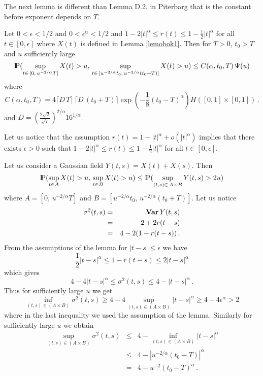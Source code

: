 The next lemma is different than Lemma D.2. in Piterbarg \cite{pit:96} that is the constant before 
exponent depends on $T$.
\begin{lemma}\label{lemdlak}
Let $0<\epsilon<1/2$ and $0<\epsilon^\alpha<1/2$ and $1-2|t|^\alpha\leq r(t)\leq 1-\frac{1}{2}|t|^\alpha$
for all $t\in [0,\epsilon]$ where $X(t)$ is defined in Lemma \ref{lemobok1}.
Then for $T>0$, $t_0>T$ and $u$ sufficiently large
$$
{\rm I\hspace{-0.8mm}P}(\sup_{t\in\, [0,\,u^{-2/\alpha}T]}X(t)>u,\,\sup_{t\in\, [u^{-2/\alpha}t_0,\,u^{-2/\alpha}(t_0+T)]}X(t)>u)
\leq C(\alpha,t_0,T)\,\Psi(u)
$$
where
$$
C(\alpha,t_0,T)=
4\lceil D\,T \rceil
\,\lceil D\,(t_0+T) \rceil
\exp(-\frac{1}{8}(t_0-T)^\alpha)H([0,1]\times [0,1])\,.
$$
and  $D=\left(\frac{2\sqrt{2}}{\sqrt{7}}\right)^{2/\alpha}16^{1/\alpha}$.
\end{lemma}
\begin{remark}
Let us notice that the assumption $r(t)=1-|t|^\alpha+o(|t|^\alpha)$ implies that
there exists $\epsilon>0$ such that $1-2|t|^\alpha\leq r(t)\leq 1-\frac{1}{2}|t|^\alpha$ for all $t\in [0,\epsilon]$.
\end{remark}
\proof
Let us consider a Gaussian field $Y(t,s)=X(t)+X(s)$. Then
\begin{equation}\label{esty}
{\rm I\hspace{-0.8mm}P}(\sup_{t\in A} X(t)>u,\,\sup_{t\in B} X(t)>u)
\leq
{\rm I\hspace{-0.8mm}P}(\sup_{(t,s)\in\,A\times B} Y(t,s)>2u)
\end{equation}
where $A=[0,\,u^{-2/\alpha}T]$ and $B=[u^{-2/\alpha}t_0,\,u^{-2/\alpha}(t_0+T)]$.
Let us notice
\begin{eqnarray}
\sigma^2(t,s)&=& {\bf Var\,} Y(t,s)\label{vary}\\
&=& 2+2r(t-s)\nonumber\\
&=& 4-2(1-r(t-s))\nonumber\,.
\end{eqnarray}
From the assumptions of the lemma for $|t-s|\leq \epsilon$ we have
$$
\frac{1}{2}|t-s|^\alpha\leq 1-r(t-s)\leq 2|t-s|^\alpha 
$$
which gives
$$
4-4|t-s|^\alpha\leq \sigma^2(t,s)\leq 4-|t-s|^\alpha \,.
$$
Thus for sufficiently large $u$ we get 
\begin{equation}\label{infr}
\inf_{(t,s)\in (A\times B)}\sigma^2(t,s)\geq 4-4\sup_{(t,s)\in (A\times B)}|t-s|^\alpha
\geq 4-4\epsilon^\alpha> 2
\end{equation}
where in the last inequality we used the assumption of the lemma. Similarly
for sufficiently large $u$ we obtain
\begin{eqnarray}
\sup_{(t,s)\in (A\times B)}\sigma^2(t,s)&\leq&4-\inf_{(t,s)\in (A\times B)}|t-s|^\alpha\nonumber\\
&\leq& 4-|u^{-2/\alpha}(t_0-T)|^\alpha\nonumber\\
&=& 4-u^{-2}(t_0-T)^\alpha\,.\label{supsig}
\end{eqnarray}
